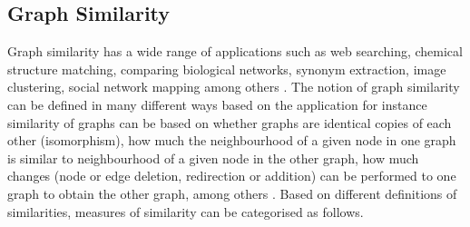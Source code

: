 \documentclass[10pt,a4paper]{article}
\theoremstyle{plain}
\theoremstyle{definition}
\begin{document}
     \subsection{Graph Similarity}
     Graph similarity has a wide range of applications such as web searching, chemical structure matching, comparing biological networks, synonym extraction, image clustering, social network mapping among others \citep{zager2008graph, nikolic2012measuring}. 
     The notion of graph similarity can be defined in many different ways based on the application for instance similarity of graphs can be based on whether graphs are identical copies of each other (isomorphism), how much the neighbourhood of a given node in one graph is similar to neighbourhood of a given node in the other graph, how much changes (node or edge deletion, redirection or addition) can be performed to one graph to obtain the other graph, among others \citep{zager2008graph}. Based on different definitions of similarities, measures of similarity can be categorised as follows.
\end{document}
